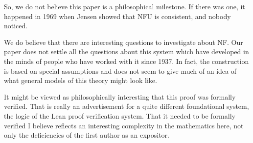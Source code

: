 \documentclass[112pt]{article}
\theoremstyle{definition}
\theoremstyle{remark}
\begin{document}
So, we do not believe this paper is a philosophical milestone.  If there was one, it happened in 1969 when Jensen showed that NFU is consistent, and nobody noticed.

We do believe that there are interesting questions to investigate about NF.  Our paper does not settle all the questions about this system which have developed in the minds of people who have worked with it since 1937.  In fact, the construction is based on special assumptions  and does not seem to give much of an idea of what general models of this theory might look like.

It might be viewed as philosophically interesting that this proof was formally verified.  That is really an advertisement for a quite different foundational system, the logic of the Lean proof verification system.   That it needed to be formally verified I believe reflects an interesting complexity in the mathematics here, not only the deficiencies of the first author as an expositor.



\newpage
\end{document}
